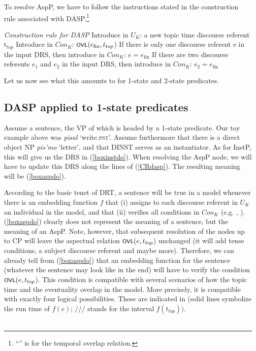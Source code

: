 \documentclass[output=paper,colorlinks,citecolor=brown]{langscibook}
\begin{document}
To resolve AspP, we have to follow the instructions stated in the construction rule associated with DASP.\footnote{``'' is for the temporal overlap relation.}

\eanoraggedright\label{CRdasp} \textit{Construction rule for DASP}
\eanoraggedright Introduce in $U_K$: a new topic time discourse referent t$_{top}$
\ex Introduce in $Con_K$: $\cnst{ovl}(e_{\text{fin}},t_{top}$) 
\ex If there is only one discourse referent e in the input DRS, then introduce in $Con_K$: $e = e_{\text{fin}}$
\ex If there are two discourse referents $e_1$ and $e_2$ in the input DRS, then introduce in $Con_K$: $e_2 = e_{\text{fin}}$
\z
\z

\noindent Let us now see what this amounts to for 1-state and 2-state predicates.

\subsection{DASP applied to 1-state predicates}\label{daspone}
Assume a sentence, the VP of which is headed by a 1-state predicate. Our toy example above was \textit{pisal} `write.\textsc{pst}'. Assume furthermore that there is a direct object NP \textit{pis'mo} `letter', and that DINST serves as an instantiator. As for InstP, this will give us the DRS in (\ref{boxinstdo}). When resolving the AspP node, we will have to update this DRS along the lines of (\ref{CRdasp}). The resulting meaning will be (\ref{boxaspdo}).


\noindent According to the basic tenet of DRT, a sentence will be true in a model whenever there is an embedding function $f$ that (i) assigns to each discourse referent in $U_K$ an individual in the model, and that (ii)  
verifies all conditions in $Con_K$ (e.g. \citealt{Kamp1993}, \citealt{Geurtsetal2020}). 
(\ref{boxaspdo}) clearly does not represent the meaning of a sentence, but 
the meaning of an AspP. Note, however, that subsequent resolution of the nodes up to CP will leave the aspectual relation $\cnst{ovl}(e,t_{top}$) unchanged (it will add tense conditions, a subject discourse referent and maybe more).  
Therefore, we can already tell from (\ref{boxaspdo}) 
that an embedding function for the sentence (whatever the sentence may look like in the end) will have to verify   
the condition $\cnst{ovl}(e,t_{top}$). This condition is compatible with several scenarios of how the topic time and the eventuality overlap in the model. More precisely, it is compatible with exactly four logical possibilities. 
These are indicated in 
(solid lines symbolize the run time of $f(e)$; $///$ stands for the interval $f(t_{top}))$.\\$\,$
 
\end{document}
